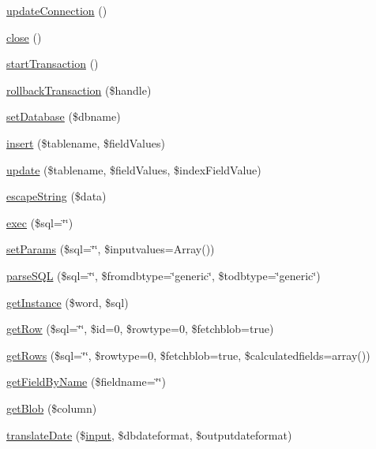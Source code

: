 \begin{DoxyCompactItemize}
\item 
\hyperlink{classDebby_af1c5109d660051d5d1d2f8e88d776cea}{update\+Connection} ()
\item 
\hyperlink{classDebby_a06df5effa73c9b99f02d0fdeebecbf0f}{close} ()
\item 
\hyperlink{classDebby_ad97845c3825dd2a5c44a8dcfc6bfda65}{start\+Transaction} ()
\item 
\hyperlink{classDebby_acbf53661ff480214270460ed6c3c915f}{rollback\+Transaction} (\$handle)
\item 
\hyperlink{classDebby_a462573b994e1cd2bdbe58c43232187d3}{set\+Database} (\$dbname)
\item 
\hyperlink{classDebby_aafffcf8afae3d308853f4452cd09babe}{insert} (\$tablename, \$field\+Values)
\item 
\hyperlink{classDebby_a482145f057ea4b31d4414d0ea8997244}{update} (\$tablename, \$field\+Values, \$index\+Field\+Value)
\item 
\hyperlink{classDebby_a6bb2e5dfb70e57d980b9141ac44d0899}{escape\+String} (\$data)
\item 
\hyperlink{classDebby_a246a7d5268c855f26ce31f4088ce56e9}{exec} (\$sql=\char`\"{}\char`\"{})
\item 
\hyperlink{classDebby_a3e22f5b7c5524ca41f92ed4cb4bb50ed}{set\+Params} (\$sql=\char`\"{}\char`\"{}, \$inputvalues=Array())
\item 
\hyperlink{classDebby_a158d8946c888e34ad361f91645c21084}{parse\+S\+Q\+L} (\$sql=\char`\"{}\char`\"{}, \$fromdbtype=\char`\"{}generic\char`\"{}, \$todbtype=\char`\"{}generic\char`\"{})
\item 
\hyperlink{classDebby_a84bc3c4e3d17a383ed9d52601307be51}{get\+Instance} (\$word, \$sql)
\item 
\hyperlink{classDebby_ad22b79682ec8b3d4802ed60968249fd6}{get\+Row} (\$sql=\char`\"{}\char`\"{}, \$id=0, \$rowtype=0, \$fetchblob=true)
\item 
\hyperlink{classDebby_a0f983cda85b634ae248dd528a605ce56}{get\+Rows} (\$sql=\char`\"{}\char`\"{}, \$rowtype=0, \$fetchblob=true, \$calculatedfields=array())
\item 
\hyperlink{classDebby_ae3da5f2c30b39f32c11450f95a684613}{get\+Field\+By\+Name} (\$fieldname=\char`\"{}\char`\"{})
\item 
\hyperlink{classDebby_a0c6292e7aae1a2161145246065dd206f}{get\+Blob} (\$column)
\item 
\hyperlink{classDebby_a869768fbe62f60229e62cfe2fce9f1e2}{translate\+Date} (\$\hyperlink{Shape_8php_a6210da308e7ce036a6362dca3018d6db}{input}, \$dbdateformat, \$outputdateformat)

\end{DoxyCompactItemize}
